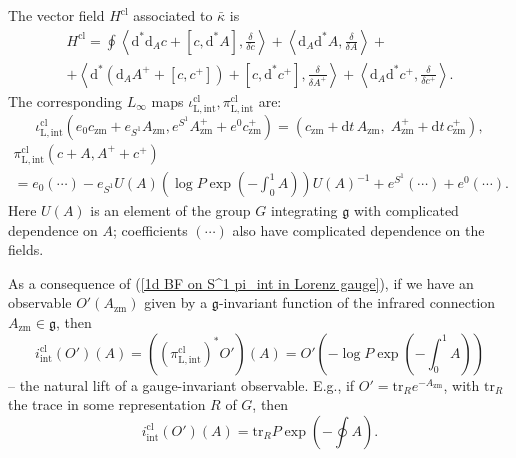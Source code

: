 \documentclass{amsart}
\theoremstyle{plain} %
\theoremstyle{definition}
\theoremstyle{remark}
\newcommand{\g}{\mathfrak{g}}
\newcommand{\mr}{\mathrm}
\newcommand{\ii}{\mathrm{int}}
\newcommand{\cl}{\mathrm{cl}}
\newcommand{\zm}{\mathrm{zm}}
\newcommand{\dr}{\mathrm{d}}
\begin{document}
The vector field $H^\cl$ associated to $\bar\kappa$ is
\begin{multline}
    H^\cl=\oint \left\langle \dr^* \dr_A c+[c,\dr^*A],\frac{\delta}{\delta c} \right\rangle + \left\langle \dr_A \dr^* A ,\frac{\delta }{\delta A} \right\rangle
    +\\
    +\left\langle \dr^*(\dr_A A^+ +[c,c^+])+[c,\dr^*c^+],\frac{\delta}{\delta A^+} 
    \right\rangle + \left\langle \dr_A \dr^* c^+,\frac{\delta }{\delta c^+} \right\rangle.
\end{multline}
The corresponding $L_\infty$ maps $\iota_\mr{L,int}^\cl,\pi_\mr{L,int}^\cl$ are:
\begin{equation}
    \iota_\mr{L,int}^\cl(e_0 c_\zm+e_{S^1}A_\zm,e^{S^1}A^+_\zm+e^0 c^+_\zm)= (c_\zm+\dr t\, A_\zm,\; A^+_\zm+\dr t\, c^+_\zm),
\end{equation}
\begin{multline}\label{1d BF on S^1 pi_int in Lorenz gauge}
    \pi_\mr{L,int}^\cl(c+A,A^++c^+)\\
    = %
    e_0 (\cdots) -e_{S^1} U(A)\left(\log P\exp\left(-\int_0^1 A\right)\right) U(A)^{-1}+ e^{S^1}(\cdots)+e^0(\cdots).
\end{multline}
Here $U(A)$ is an element of the group $G$ integrating $\g$ with complicated dependence on $A$; 
coefficients $(\cdots)$ also have complicated dependence on the fields.

As a consequence of (\ref{1d BF on S^1 pi_int in Lorenz gauge}), if we have an observable $O'(A_\zm)$ given by a $\g$-invariant function of the infrared connection $A_\zm\in \g$, then
\begin{equation}\label{i_int^cl(O') for a class function on S^1}
i_\ii^\cl(O')(A)=((\pi_{\mr{L},\ii}^\cl)^*O')(A)=O'\left(-\log P\exp\left(-\int_0^1A\right)\right)
\end{equation}
-- the natural lift of a gauge-invariant observable. E.g., if $O'=\mr{tr}_R e^{-A_\zm} $, with $\mr{tr}_R$ the trace in some representation $R$ of $G$, then
\begin{equation}\label{i_int^cl(IR Wilson loop) on S^1}
    i_\ii^\cl(O')(A)= \mr{tr}_R P\exp\left(-\oint A\right).
\end{equation}
\end{document}

